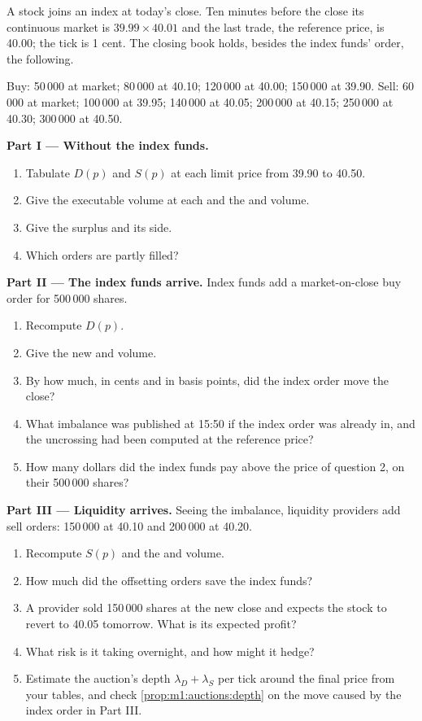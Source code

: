 \begin{problem}\label{pb:m1:auctions:1}
A stock joins an index at today's close. Ten minutes before the close its
continuous market is $39.99 \times 40.01$ and the last trade, the reference
price, is 40.00; the tick is 1 cent. The closing book holds, besides the
index funds' order, the following.

Buy: 50\,000 at market; 80\,000 at 40.10; 120\,000 at 40.00; 150\,000 at 39.90.
Sell: 60\,000 at market; 100\,000 at 39.95; 140\,000 at 40.05; 200\,000 at
40.15; 250\,000 at 40.30; 300\,000 at 40.50.

\medskip\noindent\textbf{Part I --- Without the index funds.}
\begin{enumerate}
\item Tabulate $D(p)$ and $S(p)$ at each limit price from 39.90 to 40.50.
\item Give the executable volume at each and the  and volume.
\item Give the surplus and its side.
\item Which orders are partly filled?
\end{enumerate}

\medskip\noindent\textbf{Part II --- The index funds arrive.}
Index funds add a market-on-close buy order for 500\,000 shares.
\begin{enumerate}[resume]
\item Recompute $D(p)$.
\item Give the new  and volume.
\item By how much, in cents and in basis points, did the index order move
the close?
\item What imbalance was published at 15:50 if the index order was already
in, and the uncrossing had been computed at the reference price?
\item How many dollars did the index funds pay above the price of question
2, on their 500\,000 shares?
\end{enumerate}

\medskip\noindent\textbf{Part III --- Liquidity arrives.}
Seeing the imbalance, liquidity providers add sell orders: 150\,000 at 40.10
and 200\,000 at 40.20.
\begin{enumerate}[resume]
\item Recompute $S(p)$ and the  and volume.
\item How much did the offsetting orders save the index funds?
\item A provider sold 150\,000 shares at the new close and expects the stock
to revert to 40.05 tomorrow. What is its expected profit?
\item What risk is it taking overnight, and how might it hedge?
\item Estimate the auction's depth $\lambda_D + \lambda_S$ per tick around the
final price from your tables, and check \cref{prop:m1:auctions:depth} on the
move caused by the index order in Part III.
\end{enumerate}


\end{problem}
